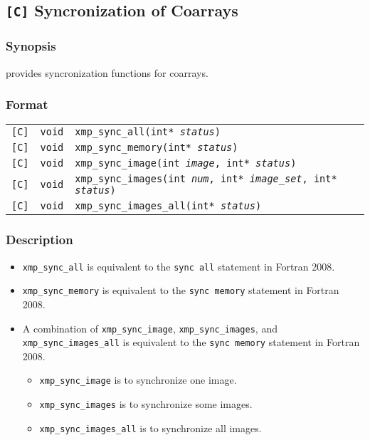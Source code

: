 \subsection{{\tt [C]} Syncronization of Coarrays} 
\subsubsection*{Synopsis}
{\XMPC} provides syncronization functions for coarrays.

\subsubsection*{Format}
\begin{tabular}{lll}
\verb![C]!&  {\tt void}& {\tt xmp\_sync\_all(int* {\it status})} \\
\verb![C]!&  {\tt void}& {\tt xmp\_sync\_memory(int* {\it status})} \\
\verb![C]!&  {\tt void}& {\tt xmp\_sync\_image(int {\it image}, int* {\it status})} \\
\verb![C]!&  {\tt void}& {\tt xmp\_sync\_images(int {\it num}, int* {\it image\_set}, int* {\it status})} \\
\verb![C]!&  {\tt void}& {\tt xmp\_sync\_images\_all(int* {\it status})}
\end{tabular}

\subsubsection*{Description}

\begin{itemize}
 \item {\tt xmp\_sync\_all} is equivalent to the {\tt sync all} statement in Fortran 2008.
 \item {\tt xmp\_sync\_memory} is equivalent to the {\tt sync memory} statement in Fortran 2008.
 \item A combination of {\tt xmp\_sync\_image}, {\tt xmp\_sync\_images}, and {\tt xmp\_sync\_images\_all} 
   is equivalent to the {\tt sync memory} statement in Fortran 2008.
  \begin{itemize}
    \item {\tt xmp\_sync\_image} is to synchronize one image.
    \item {\tt xmp\_sync\_images} is to synchronize some images.
    \item {\tt xmp\_sync\_images\_all} is to synchronize all images.
  \end{itemize}
\end{itemize}

